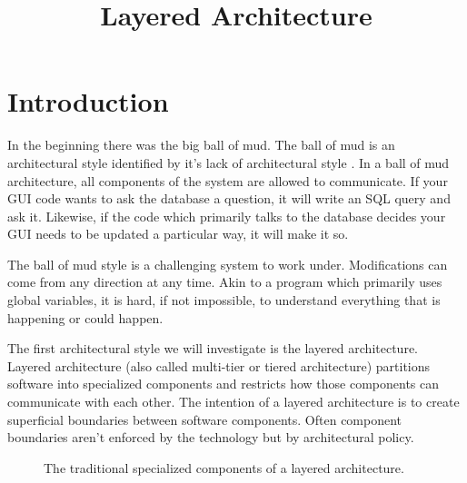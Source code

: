 \title{Layered Architecture}
\maketitle

\section{Introduction}
In the beginning there was the big ball of mud.
The ball of mud is an architectural style identified by it's lack of architectural style \cite{ballofmud}.
In a ball of mud architecture, all components of the system are allowed to communicate.
If your GUI code wants to ask the database a question, it will write an SQL query and ask it.
Likewise, if the code which primarily talks to the database decides your GUI needs to be updated a particular way, it will make it so.

The ball of mud style is a challenging system to work under.
Modifications can come from any direction at any time.
Akin to a program which primarily uses global variables,
it is hard, if not impossible,
to understand everything that is happening or could happen.

The first architectural style we will investigate is the layered architecture.
Layered architecture (also called multi-tier or tiered architecture) 
partitions software into specialized components and restricts how those components can communicate with each other.
The intention of a layered architecture is to create superficial boundaries between software components.
Often component boundaries aren't enforced by the technology but by architectural policy.


\begin{figure}[h]
\centering
{}
\caption{The traditional specialized components of a layered architecture.}
\label{fig:traditional-layered}
\end{figure}

